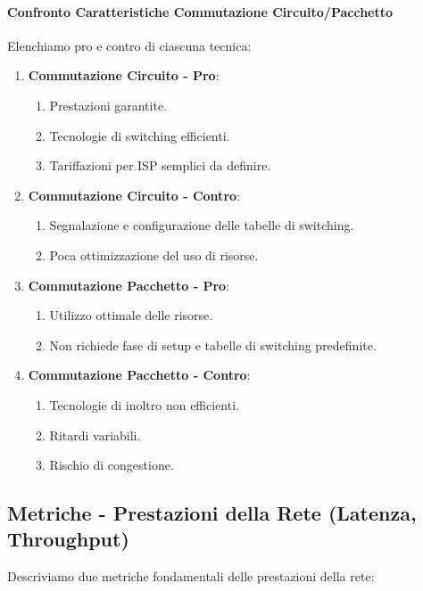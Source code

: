 \documentclass{article}
\begin{document}
\paragraph{Confronto Caratteristiche Commutazione Circuito/Pacchetto} Elenchiamo pro e contro di ciascuna tecnica:

\begin{enumerate}
    \item \textbf{Commutazione Circuito - Pro}:
    \begin{enumerate}
        \item Prestazioni garantite.
        \item Tecnologie di switching efficienti.
        \item Tariffazioni per ISP semplici da definire.
    \end{enumerate}
    \item \textbf{Commutazione Circuito - Contro}:
    \begin{enumerate}
        \item Segnalazione e configurazione delle tabelle di switching.
        \item Poca ottimizzazione del uso di risorse.
    \end{enumerate}
    \newpage
    \item \textbf{Commutazione Pacchetto - Pro}:
    \begin{enumerate}
        \item Utilizzo ottimale delle risorse.
        \item Non richiede fase di setup e tabelle di switching predefinite.
    \end{enumerate}
    \item \textbf{Commutazione Pacchetto - Contro}:
    \begin{enumerate}
        \item Tecnologie di inoltro non efficienti.
        \item Ritardi variabili.
        \item Rischio di congestione.
    \end{enumerate}

\end{enumerate}

\subsection{Metriche - Prestazioni della Rete (Latenza, Throughput)}

Descriviamo due metriche fondamentali delle prestazioni della rete:
\end{document}
